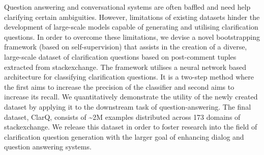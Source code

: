 Question answering and conversational systems are often baffled and need help clarifying certain ambiguities. However, limitations of existing datasets hinder the development of large-scale models capable of generating and utilising clarification questions. In order to overcome these limitations, we devise a novel bootstrapping framework (based on self-supervision) that assists in the creation of a diverse, large-scale dataset of clarification questions based on post-comment tuples extracted from stackexchange. The framework utilises a neural network based architecture for classifying clarification questions. It is a two-step method where the first aims to increase the precision of the classifier and second aims to increase its recall. We quantitatively demonstrate the utility of the newly created dataset by applying it to the downstream task of question-answering. The final dataset, ClarQ, consists of {\textasciitilde}2M examples distributed across 173 domains of stackexchange. We release this dataset in order to foster research into the field of clarification question generation  with the larger goal of enhancing dialog and question answering systems.
